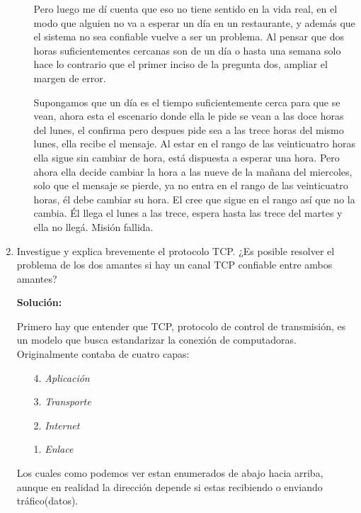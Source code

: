 \documentclass[8pt, letterpaper]{article}
\begin{document}
\begin{enumerate}
\begin{itemize}
    \hfill\break
    Pero luego me dí cuenta que eso no tiene sentido en la vida real, en el
    modo que alguien no va a esperar un día en un restaurante, y además
    que el sistema no sea confiable vuelve a ser un problema. Al pensar que
    dos horas suficientementes cercanas son de un día o hasta una semana solo
    hace lo contrario que el primer inciso de la pregunta dos, ampliar el margen
    de error.
    
    \hfill\break
    Supongamos que un día es el tiempo suficientemente cerca para
    que se vean, ahora esta el escenario donde ella le pide se vean a las doce
    horas del lunes, el confirma pero despues pide sea a las trece horas
    del mismo lunes, ella recibe el mensaje. Al estar en el rango de las
    veinticuatro horas ella sigue sin cambiar de hora, está dispuesta a
    esperar una hora. Pero ahora ella decide cambiar la hora a
    las nueve de la mañana del miercoles, solo que el mensaje se pierde,
    ya no entra en el rango de las veinticuatro horas, él debe cambiar su hora. 
    El cree que sigue en el rango así que no la cambia.
    Él llega el lunes a las trece, espera hasta las trece del martes y ella no
    llegá. Misión fallida.
    \hfill\break
  \end{itemize}
  \ttfamily
  \rmfamily
\item Investigue y explica brevemente el protocolo TCP. ¿Es posible resolver
  el problema de los dos amantes si hay un canal TCP confiable entre ambos
  amantes?
  \ttfamily
  
  \hfill\break
      {\bf Solución:}
      \hfill\break

      Primero hay que entender que TCP, protocolo de control de transmisión, es
      un modelo que busca estandarizar la conexión de computadoras.
      Originalmente contaba de cuatro capas:
      \begin{enumerate}
      \item[4.]\textit{Aplicación}
      \item[3.] \textit{Transporte}
      \item[2.] \textit{Internet}
      \item[1.] \textit{Enlace}
      \end{enumerate}
      Los cuales como podemos ver estan enumerados de abajo hacia arriba, aunque
      en realidad la dirección depende si estas recibiendo o enviando
      tráfico(datos).


\end{enumerate}
\end{document}
